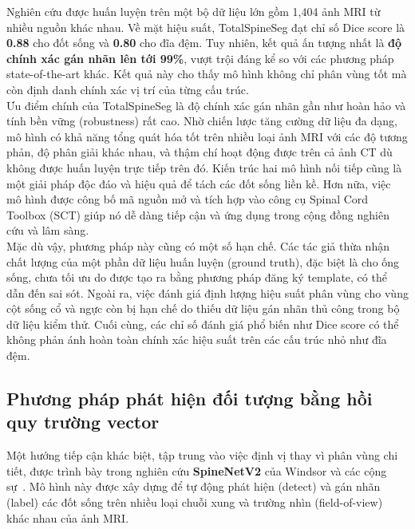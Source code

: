 Nghiên cứu được huấn luyện trên một bộ dữ liệu lớn gồm 1,404 ảnh MRI từ nhiều nguồn khác nhau. Về mặt hiệu suất, TotalSpineSeg đạt chỉ số Dice score là \textbf{0.88} cho đốt sống và \textbf{0.80} cho đĩa đệm. Tuy nhiên, kết quả ấn tượng nhất là \textbf{độ chính xác gán nhãn lên tới 99\%}, vượt trội đáng kể so với các phương pháp state-of-the-art khác. Kết quả này cho thấy mô hình không chỉ phân vùng tốt mà còn định danh chính xác vị trí của từng cấu trúc.\\

Ưu điểm chính của TotalSpineSeg là độ chính xác gán nhãn gần như hoàn hảo và tính bền vững (robustness) rất cao. Nhờ chiến lược tăng cường dữ liệu đa dạng, mô hình có khả năng tổng quát hóa tốt trên nhiều loại ảnh MRI với các độ tương phản, độ phân giải khác nhau, và thậm chí hoạt động được trên cả ảnh CT dù không được huấn luyện trực tiếp trên đó. Kiến trúc hai mô hình nối tiếp cũng là một giải pháp độc đáo và hiệu quả để tách các đốt sống liền kề. Hơn nữa, việc mô hình được công bố mã nguồn mở và tích hợp vào công cụ Spinal Cord Toolbox (SCT) giúp nó dễ dàng tiếp cận và ứng dụng trong cộng đồng nghiên cứu và lâm sàng.\\

Mặc dù vậy, phương pháp này cũng có một số hạn chế. Các tác giả thừa nhận chất lượng của một phần dữ liệu huấn luyện (ground truth), đặc biệt là cho ống sống, chưa tối ưu do được tạo ra bằng phương pháp đăng ký template, có thể dẫn đến sai sót. Ngoài ra, việc đánh giá định lượng hiệu suất phân vùng cho vùng cột sống cổ và ngực còn bị hạn chế do thiếu dữ liệu gán nhãn thủ công trong bộ dữ liệu kiểm thử. Cuối cùng, các chỉ số đánh giá phổ biến như Dice score có thể không phản ánh hoàn toàn chính xác hiệu suất trên các cấu trúc nhỏ như đĩa đệm.

\subsection{Phương pháp phát hiện đối tượng bằng hồi quy trường vector}
Một hướng tiếp cận khác biệt, tập trung vào việc định vị thay vì phân vùng chi tiết, được trình bày trong nghiên cứu \textbf{SpineNetV2} của Windsor và các cộng sự~\cite{windsor2022spinenetv2}. Mô hình này được xây dựng để tự động phát hiện (detect) và gán nhãn (label) các đốt sống trên nhiều loại chuỗi xung và trường nhìn (field-of-view) khác nhau của ảnh MRI.\\

